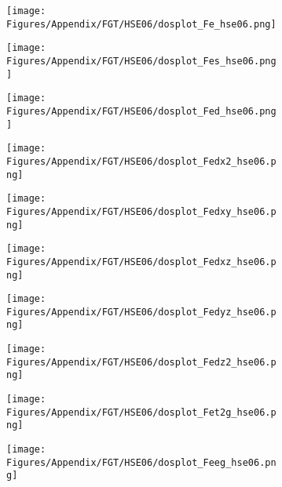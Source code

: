\begin{figure}[H]
      \centering
    \begin{subfigure}{0.24\textwidth}
    \texttt{[image: Figures/Appendix/FGT/HSE06/dosplot\_Fe\_hse06.png]}
    \label{dosplot_Fe_hse06}   
    \end{subfigure}  
    \hfill
\begin{subfigure}{0.24\textwidth}
\centering
    \texttt{[image: Figures/Appendix/FGT/HSE06/dosplot\_Fes\_hse06.png]}
    \label{dosplot_Fes_hse06}
\end{subfigure}
\hfill
\begin{subfigure}{0.24\textwidth}
    \texttt{[image: Figures/Appendix/FGT/HSE06/dosplot\_Fed\_hse06.png]}
    \label{dosplot_Fed_hse06}
\end{subfigure}
\hfill
\begin{subfigure}{0.24\textwidth}
    \texttt{[image: Figures/Appendix/FGT/HSE06/dosplot\_Fedx2\_hse06.png]}
    \label{dodosplot_Fedx2_hse06}
\end{subfigure}
\hfill
\begin{subfigure}{0.24\textwidth}
    \texttt{[image: Figures/Appendix/FGT/HSE06/dosplot\_Fedxy\_hse06.png]}
    \label{dosplot_Fedxy_hse06}
\end{subfigure}
\hfill
\begin{subfigure}{0.24\textwidth}
    \texttt{[image: Figures/Appendix/FGT/HSE06/dosplot\_Fedxz\_hse06.png]}
    \label{dosplot_Fedxz_hse06}
\end{subfigure}
\hfill
\begin{subfigure}{0.24\textwidth}
    \texttt{[image: Figures/Appendix/FGT/HSE06/dosplot\_Fedyz\_hse06.png]}
    \label{dosplot_Fedyz_hse06}
\end{subfigure}
\hfill
\begin{subfigure}{0.24\textwidth}
    \texttt{[image: Figures/Appendix/FGT/HSE06/dosplot\_Fedz2\_hse06.png]}
    \label{dosplot_Fedz2_hse06}
\end{subfigure}
\hfill
\begin{subfigure}{0.24\textwidth}
    \texttt{[image: Figures/Appendix/FGT/HSE06/dosplot\_Fet2g\_hse06.png]}
    \label{dosplot_Fet2g_hse06}
\end{subfigure}
\hfill
\begin{subfigure}{0.24\textwidth}
    \texttt{[image: Figures/Appendix/FGT/HSE06/dosplot\_Feeg\_hse06.png]}
    \label{dosplot_Feeg_hse06}

\end{subfigure}
\end{figure}
